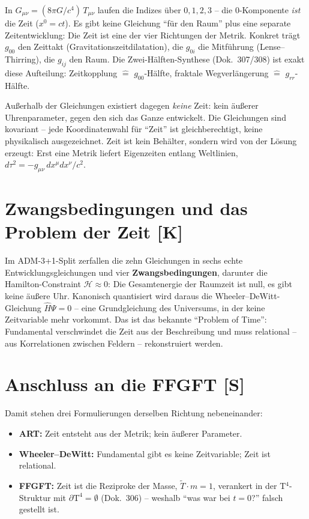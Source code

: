 \documentclass[11pt]{report}
\begin{document}
In $G_{\mu\nu} = (8\pi G/c^4)\,T_{\mu\nu}$ laufen die Indizes über
$0,1,2,3$ -- die $0$-Komponente \emph{ist} die Zeit ($x^0 = ct$).
Es gibt keine Gleichung \enquote{für den Raum} plus eine separate
Zeitentwicklung: Die Zeit ist eine der vier Richtungen der Metrik.
Konkret trägt $g_{00}$ den Zeittakt (Gravitationszeitdilatation),
die $g_{0i}$ die Mitführung (Lense--Thirring), die $g_{ij}$ den
Raum. Die Zwei-Hälften-Synthese (Dok.~307/308) ist exakt diese
Aufteilung: Zeitkopplung $\hat{=}$ $g_{00}$-Hälfte, fraktale
Wegverlängerung $\hat{=}$ $g_{rr}$-Hälfte.

Außerhalb der Gleichungen existiert dagegen \emph{keine} Zeit: kein
äußerer Uhrenparameter, gegen den sich das Ganze entwickelt. Die
Gleichungen sind kovariant -- jede Koordinatenwahl für
\enquote{Zeit} ist gleichberechtigt, keine physikalisch
ausgezeichnet. Zeit ist kein Behälter, sondern wird von der Lösung
erzeugt: Erst eine Metrik liefert Eigenzeiten entlang Weltlinien,
$d\tau^2 = -g_{\mu\nu}\,dx^\mu dx^\nu/c^2$.

\section{Zwangsbedingungen und das Problem der Zeit [K]}

Im ADM-3+1-Split zerfallen die zehn Gleichungen in sechs echte
Entwicklungsgleichungen und vier \textbf{Zwangsbedingungen},
darunter die Hamilton-Constraint $\mathcal{H} \approx 0$: Die
Gesamtenergie der Raumzeit ist null, es gibt keine äußere Uhr.
Kanonisch quantisiert wird daraus die Wheeler--DeWitt-Gleichung
$\hat{H}\Psi = 0$ -- eine Grundgleichung des Universums, in der
keine Zeitvariable mehr vorkommt. Das ist das bekannte
\enquote{Problem of Time}: Fundamental verschwindet die Zeit aus
der Beschreibung und muss relational -- aus Korrelationen zwischen
Feldern -- rekonstruiert werden.

\section{Anschluss an die FFGFT [S]}

Damit stehen drei Formulierungen derselben Richtung nebeneinander:

\begin{itemize}
  \item \textbf{ART:} Zeit entsteht aus der Metrik; kein äußerer
        Parameter.
  \item \textbf{Wheeler--DeWitt:} Fundamental gibt es keine
        Zeitvariable; Zeit ist relational.
  \item \textbf{FFGFT:} Zeit ist die Reziproke der Masse,
        $\tilde T \cdot m = 1$, verankert in der T$^4$-Struktur mit
        $\partial\text{T}^4 = \emptyset$ (Dok.~306) -- weshalb
        \enquote{was war bei $t=0$?} falsch gestellt ist.
\end{itemize}
\end{document}
